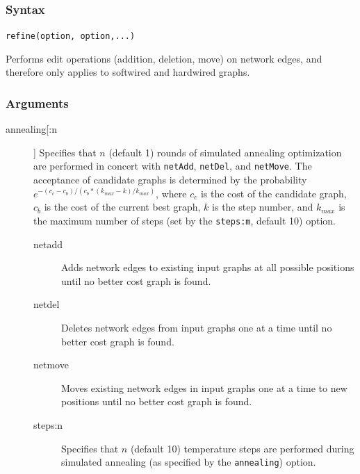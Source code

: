	\subsubsection{Syntax}
		\texttt{refine(option, option,...)}
		
	\begin{phygdescription}
		{Performs edit operations (addition, deletion, move) on network edges, and therefore
		only applies to softwired and hardwired graphs.}
	\end{phygdescription}

	\subsubsection{Arguments}
		
		\begin{description}
		\item[annealing[:n]] Specifies that $n$ (default 1) rounds of simulated annealing optimization 
		\citep{Metropolisetal1953, Kirkpatricketal1983, Cerny1985} are performed in concert with 
		\texttt{netAdd}, \texttt{netDel}, and \texttt{netMove}. The acceptance of candidate graphs is 
		determined by the probability $e ^ {- (c_c - c_b)/ (c_b * (k_{max} -k)/ k_{max})}$, where $c_c$ 
		is the cost of the candidate graph, $c_b$ is the cost of the current best graph, $k$ is the step 
		number, and $k_{max}$ is the maximum number of steps (set by the \texttt{steps:m}, default 10) 
		option.
		
			\begin{description}
		
			\item[netadd] Adds network edges to existing input graphs at all possible positions until no 
			better cost graph is found.
			
			\item[netdel] Deletes network edges from input graphs one at a time until no better cost 
			graph is found.
			
			\item[netmove] Moves existing network edges in input graphs one at a time to new positions 
			until no better cost graph 
			is found.
			
			\item[steps:n] Specifies that $n$ (default 10) temperature steps are performed during 
			simulated 
			annealing (as specified by the \texttt{annealing}) option.

			\end{description}


\end{description}
